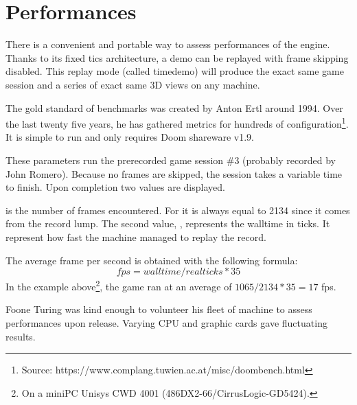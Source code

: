 \section{Performances}
There is a convenient and portable way to assess performances of the engine. Thanks to its fixed tics architecture, a demo can be replayed with frame skipping disabled. This replay mode (called timedemo) will produce the exact same game session and a series of exact same 3D views on any machine.\\
\par
The gold standard of benchmarks was created by Anton Ertl around 1994. Over the last twenty five years, he has gathered metrics for hundreds of configuration\footnote{Source: https://www.complang.tuwien.ac.at/misc/doombench.html}.  It is simple to run and only requires Doom shareware v1.9.\\
\par
{}
\par
These parameters run the prerecorded game session \#3 (probably recorded by John Romero). Because no frames are skipped, the session takes a variable time to finish. Upon completion two values are displayed.\\
\par
{}
\par

 is the number of frames encountered. For  it is always equal to 2134 since it comes from the record lump. The second value, , represents the walltime in ticks. It represent how fast the machine managed to replay the record.\\
\par
 The average frame per second is obtained with the following formula: $$ fps = walltime/realticks * 35 $$ 
In the example above\footnote{On a miniPC Unisys CWD 4001 (486DX2-66/CirrusLogic-GD5424).}, the game ran at an average of $1065/2134*35 = 17$ fps.\\
\par
Foone Turing was kind enough to volunteer his fleet of machine to assess performances upon release. Varying CPU and graphic cards gave fluctuating results.\\
\par


